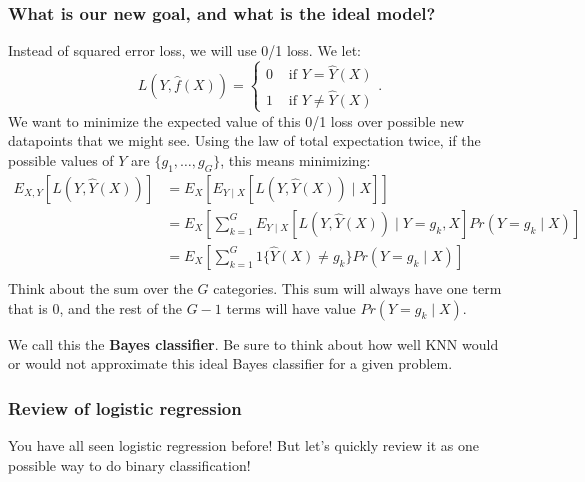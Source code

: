 \subsubsection{What is our new goal, and what is the ideal model?}

Instead of squared error loss, we will use 0/1 loss. We let: 
$$
L(Y, \hat{f}(X)) = \begin{cases}
 0 & \text { if } Y = \hat{Y}(X) \\
 1 & \text{ if } Y \neq \hat{Y}(X)	
 \end{cases}. 
$$
We want to minimize the expected value of this 0/1 loss over possible new datapoints that we might see. Using the law of total expectation twice, if the possible values of $Y$ are $\{g_1, \ldots, g_G\}$, this means minimizing: 
\begin{align*}
E_{X,Y} \left[ L(Y, \hat{Y}(X)) \right] &= E_{X} \left[ E_{Y \mid X} \left[ L(Y, \hat{Y}(X)) \mid X \right] \right] \\
&= E_X \left [ \sum_{k=1}^G E_{Y \mid X }\left[ L(Y, \hat{Y}(X)) \mid Y = g_k, X\right] Pr(Y=g_k \mid X) \right] \\
&= E_X \left [ \sum_{k=1}^G 1\{ \hat{Y}(X) \not= g_k \} Pr(Y=g_k \mid X) \right] \\
\end{align*}
Think about the sum over the $G$ categories. This sum will always have one term that is $0$, and the rest of the $G-1$ terms will have value $Pr(Y=g_k \mid X)$. 



We call this the \textbf{Bayes classifier}. Be sure to think about how well KNN would or would not approximate this ideal Bayes classifier for a given problem. 




\subsubsection{Review of logistic regression}

You have all seen logistic regression before! But let's quickly review it as one possible way to do binary classification! 





